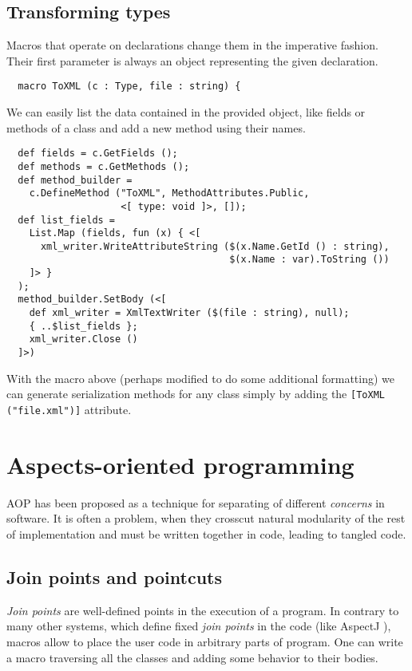 \documentclass{llncs}
\begin{document}
\subsection{Transforming types}
Macros that operate on declarations change them in the imperative fashion.
Their first parameter is always an object representing the given 
declaration. 

\begin{verbatim}
  macro ToXML (c : Type, file : string) { 
\end{verbatim}

We can easily list the data contained in the provided object, like fields 
or methods of a class and add a new method using their names.

\begin{verbatim}
  def fields = c.GetFields ();
  def methods = c.GetMethods ();
  def method_builder = 
    c.DefineMethod ("ToXML", MethodAttributes.Public, 
                    <[ type: void ]>, []);
  def list_fields = 
    List.Map (fields, fun (x) { <[ 
      xml_writer.WriteAttributeString ($(x.Name.GetId () : string), 
                                       $(x.Name : var).ToString ()) 
    ]> }
  );
  method_builder.SetBody (<[
    def xml_writer = XmlTextWriter ($(file : string), null);
    { ..$list_fields };
    xml_writer.Close ()
  ]>)
\end{verbatim}

With the macro above (perhaps modified to do some additional formatting)
we can generate serialization methods for any class simply by adding 
the \verb,[ToXML ("file.xml")], attribute.

\section{Aspects-oriented programming}
AOP has been proposed as a technique for separating of different 
\emph{concerns} in software. It is often a problem, when they crosscut 
natural modularity of the rest of implementation and must be written 
together in code, leading to tangled code. 

\subsection{Join points and pointcuts}
\emph{Join points} are well-defined points in the execution of a program.
In contrary to many other systems, which define fixed \emph{join points}
in the code (like AspectJ \cite{AspectJ}), macros allow to place the user code in 
arbitrary parts of program. One can write a macro traversing all the classes
and adding some behavior to their bodies. 
\end{document}
